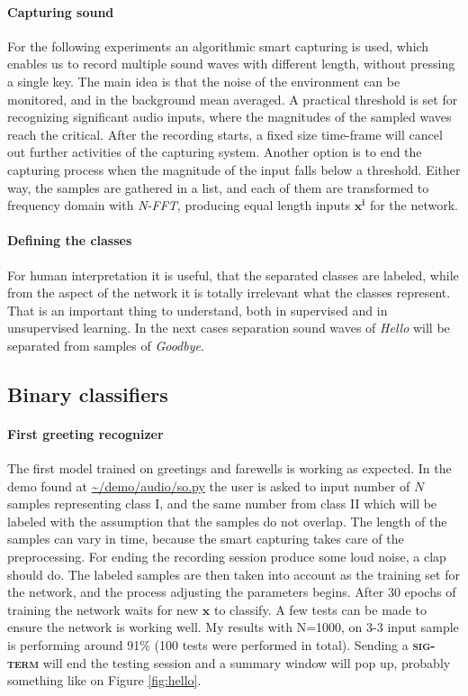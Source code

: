 \paragraph{Capturing sound}
For the following experiments an algorithmic smart capturing is used, which enables us to record multiple sound waves with different length, without pressing a single key. The main idea is that the noise of the environment can be monitored, and in the background mean averaged. A practical threshold is set for recognizing significant audio inputs, where the magnitudes of the sampled waves reach the critical. After the recording starts, a fixed size time-frame will cancel out further activities of the capturing system. Another option is to end the capturing process when the magnitude of the input falls below a threshold. Either way, the samples are gathered in a list, and each of them are transformed to frequency domain with \emph{N-FFT}, producing equal length inputs  $\mathbf{x^i}$ for the network.

\paragraph{Defining the classes}
For human interpretation it is useful, that the separated classes are labeled, while from the aspect of the network it is totally irrelevant what the classes represent. That is an important thing to understand, both in supervised and in unsupervised learning. In the next cases separation sound waves of \emph{Hello} will be separated from samples of \emph{Goodbye}.

\subsection{Binary classifiers}
\paragraph{First greeting recognizer}
The first model trained on greetings and farewells is working as expected. In the demo found at \cite{DV} \url{~/demo/audio/so.py} the user is asked to input number of $N$ samples representing class I, and the same number from class II which will be labeled with the assumption that the samples do not overlap. The length of the samples can vary in time, because the smart capturing takes care of the preprocessing. 
For ending the recording session produce some loud noise, a clap should do. 
The labeled samples are then taken into account as the training set for the network, and the process adjusting the parameters begins. 
After 30 epochs of training the network waits for new $\mathbf{x}$ to classify. 
A few tests can be made to ensure the network is working well. 
My results with N=1000, on 3-3 input sample is performing around 91\% (100 tests were performed in total). 
Sending a \textbf{\textsc{sig-term}} will end the testing session and a summary window will pop up, probably something like on Figure \ref{fig:hello}.

